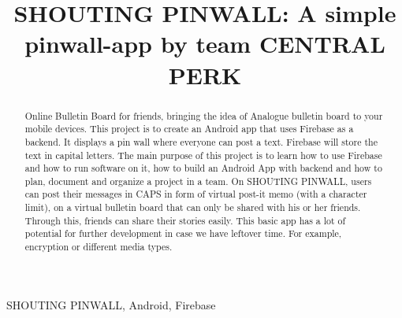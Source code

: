 \documentclass[conference]{IEEEtran}
\numberwithin{figure}{subsection}
\begin{document}
\title{SHOUTING PINWALL: A simple pinwall-app by team CENTRAL PERK\\}

\author{
\and

\and

\and

}

\maketitle

\begin{abstract}
Online Bulletin Board for friends, bringing the idea of Analogue bulletin board to your mobile devices. This project is to create an Android app that uses Firebase as a backend. It displays a pin wall where everyone can post a text. Firebase will store the text in capital letters. The main purpose of this project is to learn how to use Firebase and how to run software on it, how to build an Android App with backend and how to plan, document and organize a project in a team. On SHOUTING PINWALL, users can post their messages in CAPS in form of virtual post-it memo (with a character limit), on a virtual bulletin board that can only be shared with his or her friends. Through this, friends can share their stories easily. This basic app has a lot of potential for further development in case we have leftover time. For example, encryption or different media types.
 
\end{abstract}
\begin{IEEEkeywords}
SHOUTING PINWALL, Android, Firebase\\
\end{IEEEkeywords}
\end{document}
